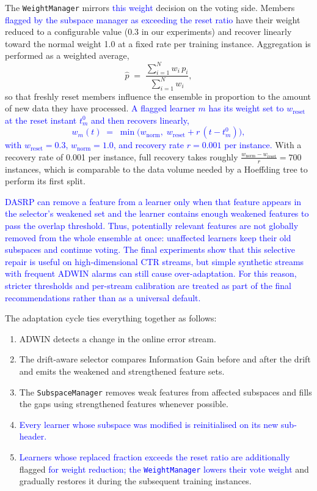 \documentclass[12pt]{article}
\newcommand{\new}[1]{\textcolor{blue}{#1}}
\begin{document}
The \texttt{WeightManager} mirrors \new{this weight} decision on the voting side.
Members \new{flagged by the subspace manager as exceeding the reset ratio} have their weight reduced
to a configurable value (0.3 in our experiments) and recover linearly toward
the normal weight 1.0 at a fixed rate per training instance. Aggregation is
performed as a weighted average,
\[
\hat{p} \;=\; \frac{\sum_{i=1}^{N} w_i \, p_i}{\sum_{i=1}^{N} w_i},
\]
so that freshly reset members influence the ensemble in proportion to the
amount of new data they have processed. \new{A flagged learner $m$ has its
weight set to $w_{\text{reset}}$ at the reset instant $t_m^{0}$ and then recovers
linearly,
\[
w_m(t) \;=\; \min\!\bigl(w_{\text{norm}},\; w_{\text{reset}} + r\,(t - t_m^{0})\bigr),
\]
with $w_{\text{reset}} = 0.3$, $w_{\text{norm}} = 1.0$, and recovery rate
$r = 0.001$ per instance.} With a recovery rate of 0.001 per
instance, full recovery takes roughly $\tfrac{w_{\text{norm}} - w_{\text{reset}}}{r} = 700$ instances, which is comparable to
the data volume needed by a Hoeffding tree to perform its first split.

\new{DASRP can remove a feature from a learner only when that feature appears
in the selector's weakened set and the learner contains enough weakened
features to pass the overlap threshold. Thus, potentially relevant features are
not globally removed from the whole ensemble at once: unaffected learners keep
their old subspaces and continue voting. The final experiments show that this
selective repair is useful on high-dimensional CTR streams, but simple
synthetic streams with frequent ADWIN alarms can still cause over-adaptation.
For this reason, stricter thresholds and per-stream calibration are treated as
part of the final recommendations rather than as a universal default.}

The adaptation cycle ties everything together as follows:

\begin{enumerate}
    \item ADWIN detects a change in the online error stream.
    \item The drift-aware selector compares Information Gain before and after
    the drift and emits the weakened and strengthened feature sets.
    \item The \texttt{SubspaceManager} removes weak features from affected
    subspaces and fills the gaps using strengthened features whenever possible.
    \item \new{Every learner whose subspace was modified is reinitialised on
    its new sub-header.}
    \item \new{Learners whose replaced fraction exceeds the reset ratio are
    additionally} flagged \new{for weight reduction; the \texttt{WeightManager}
    lowers their vote weight} and gradually restores it during the subsequent
    training instances.
\end{enumerate}
\end{document}
